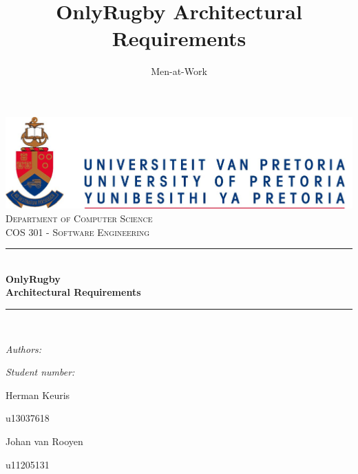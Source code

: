 \documentclass[hidelinks,a4paper,12pt]{article}
\author{Men-at-Work}
\title{ OnlyRugby Architectural Requirements}
\newcommand{\HRule}{\rule{\linewidth}{0.5mm}}
\begin{document}
\setlength{\parskip}{6pt}

\begin{titlepage}

\begin{center}
\includegraphics[width=1\textwidth]{./UPLogo2012.jpg}\\[0.4cm]    
\textsc{\LARGE Department of Computer Science}\\[1.5cm]
\textsc{\Large COS 301 - Software Engineering}\\[0.5cm]
\HRule \\[0.4cm]
{ \huge \bfseries OnlyRugby\\Architectural Requirements}\\[0.4cm]
\HRule \\[0.4cm]
\begin{minipage}{0.4\textwidth}
\begin{flushleft} \large
\emph{Authors:}
\end{flushleft}
\end{minipage}
\begin{minipage}{0.4\textwidth}
\begin{flushright} \large
\emph{Student number:}
\end{flushright}
\end{minipage}

\begin{minipage}{0.4\textwidth}
\begin{flushleft} \large
Herman {Keuris}
\end{flushleft}
\end{minipage}
\begin{minipage}{0.4\textwidth}
\begin{flushright} \large
\emph{}
u13037618
\end{flushright}
\end{minipage}

\begin{minipage}{0.4\textwidth}
\begin{flushleft} \large
Johan {van Rooyen}
\end{flushleft}
\end{minipage}
\begin{minipage}{0.4\textwidth}
\begin{flushright} \large
\emph{}
u11205131
\end{flushright}
\end{minipage}


\end{center}
\end{titlepage}
\end{document}
